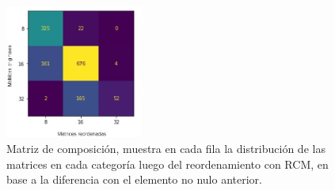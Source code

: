 \begin{figure}
    \centering
    \includegraphics[width=0.4\textwidth]{imagenes/chap4/confusion_delta_dist.jpg}
    \caption{Matriz de composición, muestra en cada fila la distribución de las matrices en cada categoría luego del reordenamiento con RCM, en base a la diferencia con el elemento no nulo anterior.}
    \label{fig:confusion_delta_dist}
\end{figure}


